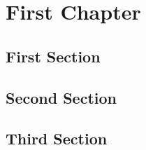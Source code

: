 \chapter{First Chapter}


\section{First Section}

\section{Second Section}

\section{Third Section}